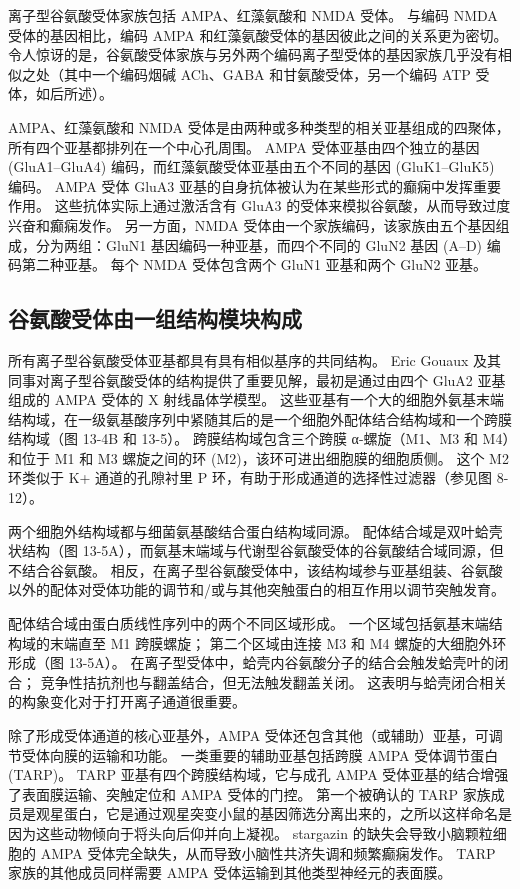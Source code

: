 离子型谷氨酸受体家族包括 AMPA、红藻氨酸和 NMDA 受体。 与编码 NMDA 受体的基因相比，编码 AMPA 和红藻氨酸受体的基因彼此之间的关系更为密切。 令人惊讶的是，谷氨酸受体家族与另外两个编码离子型受体的基因家族几乎没有相似之处（其中一个编码烟碱 ACh、GABA 和甘氨酸受体，另一个编码 ATP 受体，如后所述）。

AMPA、红藻氨酸和 NMDA 受体是由两种或多种类型的相关亚基组成的四聚体，所有四个亚基都排列在一个中心孔周围。 AMPA 受体亚基由四个独立的基因 (GluA1–GluA4) 编码，而红藻氨酸受体亚基由五个不同的基因 (GluK1–GluK5) 编码。 AMPA 受体 GluA3 亚基的自身抗体被认为在某些形式的癫痫中发挥重要作用。 这些抗体实际上通过激活含有 GluA3 的受体来模拟谷氨酸，从而导致过度兴奋和癫痫发作。 另一方面，NMDA 受体由一个家族编码，该家族由五个基因组成，分为两组：GluN1 基因编码一种亚基，而四个不同的 GluN2 基因 (A–D) 编码第二种亚基。 每个 NMDA 受体包含两个 GluN1 亚基和两个 GluN2 亚基。



\subsection{谷氨酸受体由一组结构模块构成}
所有离子型谷氨酸受体亚基都具有具有相似基序的共同结构。 Eric Gouaux 及其同事对离子型谷氨酸受体的结构提供了重要见解，最初是通过由四个 GluA2 亚基组成的 AMPA 受体的 X 射线晶体学模型。 这些亚基有一个大的细胞外氨基末端结构域，在一级氨基酸序列中紧随其后的是一个细胞外配体结合结构域和一个跨膜结构域（图 13-4B 和 13-5）。 跨膜结构域包含三个跨膜 α-螺旋（M1、M3 和 M4）和位于 M1 和 M3 螺旋之间的环 (M2)，该环可进出细胞膜的细胞质侧。 这个 M2 环类似于 K+ 通道的孔隙衬里 P 环，有助于形成通道的选择性过滤器（参见图 8-12）。

两个细胞外结构域都与细菌氨基酸结合蛋白结构域同源。 配体结合域是双叶蛤壳状结构（图 13-5A），而氨基末端域与代谢型谷氨酸受体的谷氨酸结合域同源，但不结合谷氨酸。 相反，在离子型谷氨酸受体中，该结构域参与亚基组装、谷氨酸以外的配体对受体功能的调节和/或与其他突触蛋白的相互作用以调节突触发育。

配体结合域由蛋白质线性序列中的两个不同区域形成。 一个区域包括氨基末端结构域的末端直至 M1 跨膜螺旋； 第二个区域由连接 M3 和 M4 螺旋的大细胞外环形成（图 13-5A）。 在离子型受体中，蛤壳内谷氨酸分子的结合会触发蛤壳叶的闭合； 竞争性拮抗剂也与翻盖结合，但无法触发翻盖关闭。 这表明与蛤壳闭合相关的构象变化对于打开离子通道很重要。

除了形成受体通道的核心亚基外，AMPA 受体还包含其他（或辅助）亚基，可调节受体向膜的运输和功能。 一类重要的辅助亚基包括跨膜 AMPA 受体调节蛋白 (TARP)。 TARP 亚基有四个跨膜结构域，它与成孔 AMPA 受体亚基的结合增强了表面膜运输、突触定位和 AMPA 受体的门控。 第一个被确认的 TARP 家族成员是观星蛋白，它是通过观星突变小鼠的基因筛选分离出来的，之所以这样命名是因为这些动物倾向于将头向后仰并向上凝视。 stargazin 的缺失会导致小脑颗粒细胞的 AMPA 受体完全缺失，从而导致小脑性共济失调和频繁癫痫发作。 TARP 家族的其他成员同样需要 AMPA 受体运输到其他类型神经元的表面膜。

